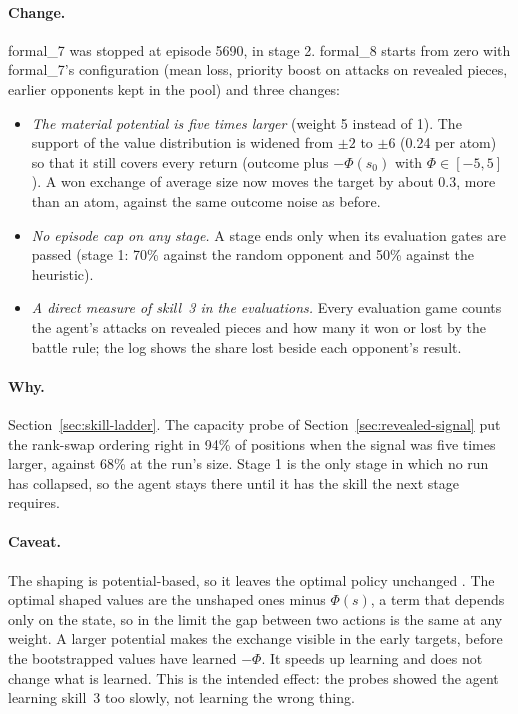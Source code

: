 \paragraph{Change.} formal\_7 was stopped at episode 5690, in stage 2. formal\_8 starts from zero
with formal\_7's configuration (mean loss, priority boost on attacks on revealed pieces, earlier
opponents kept in the pool) and three changes:
\begin{itemize}
  \item \emph{The material potential is five times larger} (weight 5 instead of 1). The support of
        the value distribution is widened from $\pm 2$ to $\pm 6$ (0.24 per atom) so that it still
        covers every return (outcome plus $-\Phi(s_0)$ with $\Phi \in [-5, 5]$). A won exchange
        of average size now moves the target by about 0.3, more than an atom, against the same
        outcome noise as before.
  \item \emph{No episode cap on any stage.} A stage ends only when its evaluation gates are
        passed (stage 1: 70\% against the random opponent and 50\% against the heuristic).
  \item \emph{A direct measure of skill~3 in the evaluations.} Every evaluation game counts the
        agent's attacks on revealed pieces and how many it won or lost by the battle rule; the log
        shows the share lost beside each opponent's result.
\end{itemize}

\paragraph{Why.} Section~\ref{sec:skill-ladder}. The capacity probe of
Section~\ref{sec:revealed-signal} put the rank-swap ordering right in 94\% of positions when the
signal was five times larger, against 68\% at the run's size. Stage 1 is the only stage in which
no run has collapsed, so the agent stays there until it has the skill the next stage requires.

\paragraph{Caveat.} The shaping is potential-based, so it leaves the optimal policy unchanged
\cite{NgPBRS}. The optimal shaped values are the unshaped ones minus $\Phi(s)$, a term that
depends only on the state, so in the limit the gap between two actions is the same at any weight.
A larger potential makes the exchange visible in the early targets, before the bootstrapped values
have learned $-\Phi$. It speeds up learning and does not change what is learned. This is the
intended effect: the probes showed the agent learning skill~3 too slowly, not learning the wrong
thing.

